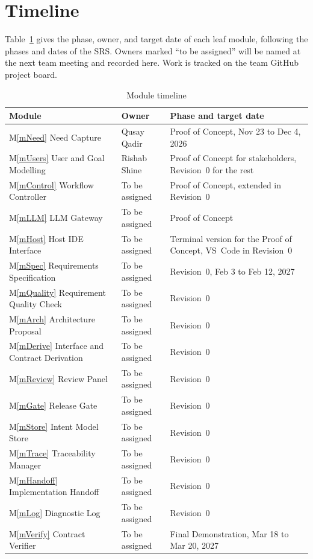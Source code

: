 \documentclass[12pt, titlepage]{article}
\newcommand{\mref}[1]{M\ref{#1}}
\begin{document}
\section{Timeline} \label{SecTimeline}

Table~\ref{TblTimeline} gives the phase, owner, and target date of each leaf
module, following the phases and dates of the SRS. Owners marked ``to be
assigned'' will be named at the next team meeting and recorded here. Work is
tracked on the team GitHub project board.

\begin{longtable}{p{} p{} p{}}
\caption{Module timeline} \label{TblTimeline}\\
\toprule
\textbf{Module} & \textbf{Owner} & \textbf{Phase and target date}\\
\midrule
\endhead
\mref{mNeed} Need Capture & Qusay Qadir & Proof of Concept, Nov 23 to Dec 4, 2026\\
\mref{mUsers} User and Goal Modelling & Rishab Shine & Proof of Concept for stakeholders, Revision~0 for the rest\\
\mref{mControl} Workflow Controller & To be assigned & Proof of Concept, extended in Revision~0\\
\mref{mLLM} LLM Gateway & To be assigned & Proof of Concept\\
\mref{mHost} Host IDE Interface & To be assigned & Terminal version for the Proof of Concept, VS~Code in Revision~0\\
\mref{mSpec} Requirements Specification & To be assigned & Revision~0, Feb 3 to Feb 12, 2027\\
\mref{mQuality} Requirement Quality Check & To be assigned & Revision~0\\
\mref{mArch} Architecture Proposal & To be assigned & Revision~0\\
\mref{mDerive} Interface and Contract Derivation & To be assigned & Revision~0\\
\mref{mReview} Review Panel & To be assigned & Revision~0\\
\mref{mGate} Release Gate & To be assigned & Revision~0\\
\mref{mStore} Intent Model Store & To be assigned & Revision~0\\
\mref{mTrace} Traceability Manager & To be assigned & Revision~0\\
\mref{mHandoff} Implementation Handoff & To be assigned & Revision~0\\
\mref{mLog} Diagnostic Log & To be assigned & Revision~0\\
\mref{mVerify} Contract Verifier & To be assigned & Final Demonstration, Mar 18 to Mar 20, 2027\\
\bottomrule
\end{longtable}
\end{document}
